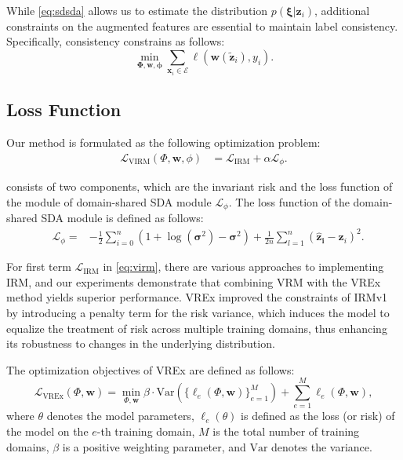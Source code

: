 While \cref{eq:sdsda} allows us to estimate the distribution  $p(\mathbf{\xi}|\mathbf{\mathbf{z}}_i)$, additional constraints on the augmented features are essential to maintain label consistency.
Specifically, consistency constrains as follows:
\begin{equation}
	\label{eq:label_consistency}
	\min_{\mathbf{\Phi, \mathbf{w}}, \mathbf{\phi}} \sum_{\mathbf{x}_i \in \mathcal{E}}  \ell (\mathbf{w}(\tilde{\mathbf{z}}_i), y_i).
\end{equation}


\subsection{Loss Function}
\label{sec:loss}
Our method is formulated as the following optimization problem:
\begin{equation}
	\label{eq:virm}
	\begin{aligned}
		\mathcal{L}_{\text{VIRM}}(\Phi, \mathbf{w}, \phi) 
		& = \mathcal{L}_{\text{IRM}} + \alpha \mathcal{L}_{\phi}.
	\end{aligned}
\end{equation}

 consists of two components, which are the invariant risk and the loss function of the module of domain-shared SDA module $\mathcal{L}_{\phi}$.
The loss function of the domain-shared SDA module is defined as follows:
\begin{equation}
	\begin{aligned}
	& \mathcal{L}_{\phi} = 
	& - \frac{1}{2}\sum_{i=0}^n(1 + \log(\boldsymbol{\sigma}^2) - \boldsymbol{\sigma}^2 ) + 
	\frac{1}{2n}\sum_{l=1}^n (\mathbf{\hat{z}_i} - \mathbf{z}_i)^2.
  \label{eq:loss_dssda}
  \end{aligned}
\end{equation}

For first term $\mathcal{L}_{\text{IRM}}$ in \cref{eq:virm}, there are various approaches to implementing IRM, and our experiments demonstrate that combining VRM with the VREx~\cite{krueger2021out} method yields superior performance. 
VREx improved the constraints of IRMv1~\cite{arjovsky2019invariant} by introducing a penalty term for the risk variance, 
which induces the model to equalize the treatment of risk across multiple training domains, thus enhancing its robustness to changes in the underlying distribution.

The optimization objectives of VREx are defined as follows:
\begin{equation}
	\label{eq:vrex}
	\mathcal{L}_{\text{VREx}}(\Phi, \mathbf{w}) = \min_{\Phi, \mathbf{w}}  \beta \cdot \text{Var}\left(\{\ell_e(\Phi, \mathbf{w})\}_{e=1}^{M}\right) + \sum_{e=1}^{M} \ell_e(\Phi, \mathbf{w}),
\end{equation}
where $ \theta $ denotes the model parameters, 
$\ell_e(\theta) $ is defined as the loss (or risk) of the model on the $e$-th training domain, 
$ M$ is the total number of training domains, 
$ \beta $ is a positive weighting parameter, 
and $ \text{Var} $ denotes the variance.


